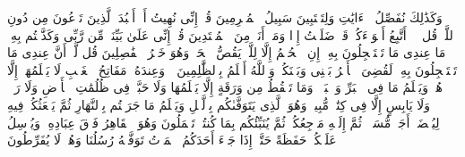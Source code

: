 \stopbuffer%
\startbuffer[\q:6:55]
وَكَذَٰلِكَ نُفَصِّلُ ٱلۡءَایَٰتِ وَلِتَسۡتَبِینَ سَبِیلُ ٱلۡمُجۡرِمِینَ%
\stopbuffer%
\startbuffer[\q:6:56]
قُلۡ إِنِّی نُهِیتُ أَنۡ أَعۡبُدَ ٱلَّذِینَ تَدۡعُونَ مِن دُونِ ٱللَّهِۚ قُل لَّاۤ أَتَّبِعُ أَهۡوَاۤءَكُمۡ قَدۡ ضَلَلۡتُ إِذࣰا وَمَاۤ أَنَا۠ مِنَ ٱلۡمُهۡتَدِینَ%
\stopbuffer%
\startbuffer[\q:6:57]
قُلۡ إِنِّی عَلَىٰ بَیِّنَةࣲ مِّن رَّبِّی وَكَذَّبۡتُم بِهِۦۚ مَا عِندِی مَا تَسۡتَعۡجِلُونَ بِهِۦۤۚ إِنِ ٱلۡحُكۡمُ إِلَّا لِلَّهِۖ یَقُصُّ ٱلۡحَقَّۖ وَهُوَ خَیۡرُ ٱلۡفَٰصِلِینَ%
\stopbuffer%
\startbuffer[\q:6:58]
قُل لَّوۡ أَنَّ عِندِی مَا تَسۡتَعۡجِلُونَ بِهِۦ لَقُضِیَ ٱلۡأَمۡرُ بَیۡنِی وَبَیۡنَكُمۡۗ وَٱللَّهُ أَعۡلَمُ بِٱلظَّٰلِمِینَ%
\stopbuffer%
\startbuffer[\q:6:59]
۞ وَعِندَهُۥ مَفَاتِحُ ٱلۡغَیۡبِ لَا یَعۡلَمُهَاۤ إِلَّا هُوَۚ وَیَعۡلَمُ مَا فِی ٱلۡبَرِّ وَٱلۡبَحۡرِۚ وَمَا تَسۡقُطُ مِن وَرَقَةٍ إِلَّا یَعۡلَمُهَا وَلَا حَبَّةࣲ فِی ظُلُمَٰتِ ٱلۡأَرۡضِ وَلَا رَطۡبࣲ وَلَا یَابِسٍ إِلَّا فِی كِتَٰبࣲ مُّبِینࣲ%
\stopbuffer%
\startbuffer[\q:6:60]
وَهُوَ ٱلَّذِی یَتَوَفَّىٰكُم بِٱلَّیۡلِ وَیَعۡلَمُ مَا جَرَحۡتُم بِٱلنَّهَارِ ثُمَّ یَبۡعَثُكُمۡ فِیهِ لِیُقۡضَىٰۤ أَجَلࣱ مُّسَمࣰّىۖ ثُمَّ إِلَیۡهِ مَرۡجِعُكُمۡ ثُمَّ یُنَبِّئُكُم بِمَا كُنتُمۡ تَعۡمَلُونَ%
\stopbuffer%
\startbuffer[\q:6:61]
وَهُوَ ٱلۡقَاهِرُ فَوۡقَ عِبَادِهِۦۖ وَیُرۡسِلُ عَلَیۡكُمۡ حَفَظَةً حَتَّىٰۤ إِذَا جَاۤءَ أَحَدَكُمُ ٱلۡمَوۡتُ تَوَفَّتۡهُ رُسُلُنَا وَهُمۡ لَا یُفَرِّطُونَ%
\stopbuffer%
